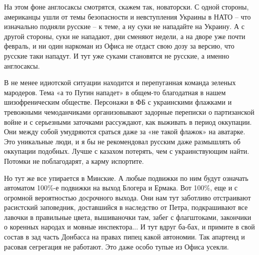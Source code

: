 На этом фоне англосаксы смотрятся, скажем так, новаторски. С одной стороны,
американцы ушли от темы безопасности и невступления Украины в НАТО – что
изначально подняли русские – к теме, а ну суки не нападайте на Украину. А с
другой стороны, суки не нападают, дни сменяют недели, а на дворе уже почти
февраль, и ни один наркоман из Офиса не отдаст свою дозу за версию, что русские
таки нападут. И тут уже суками становятся не русские, а именно англосаксы.

В не менее идиотской ситуации находится и перепуганная команда зеленых
мародеров. Тема «а то Путин нападет» в общем-то благодатная в нашем
шизофреническим обществе. Персонажи в ФБ с украинскими флажками и тревожными
чемоданчиками организовывают задорные переписки о партизанской войне и с
серьезными заточками рассуждают, как выживать в период оккупации. Они между
собой умудряются сраться даже за «не такой флажок» на аватарке. Это уникальные
люди, и я бы не рекомендовал русским даже размышлять об оккупации подобных.
Лучше с казахом потерять, чем с украинствующим найти. Потомки не поблагодарят,
а карму испортите.

Но тут же все упирается в Минские. А любые подвижки по ним будут означать
автоматом 100\%-е подвижки на выход Блогера и Ермака. Вот 100\%, еще и с огромной
вероятностью досрочного выхода. Они нам тут заботливо отстраивают расистский
заповедник, доставшийся в наследство от Петра, подкрашивают все лавочки в
правильные цвета, вышиваночки там, забег с флагштоками, закончики о коренных
народах и мовные инспектора... И тут вдруг ба-бах, и примите в свой состав в зад
часть Донбасса на правах пипец какой автономии. Так апартеид и расовая
сегрегация не работают. Это даже особо тупые из Офиса усекли.
